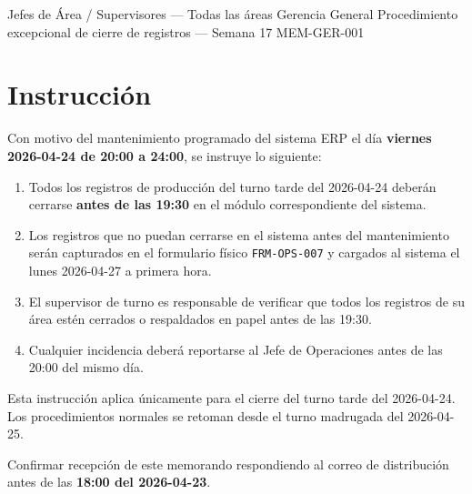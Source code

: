 \documentclass{../base/canon}
\begin{document}
\MemoBlock%
  {Jefes de Área / Supervisores — Todas las áreas}%
  {Gerencia General}%
  {Procedimiento excepcional de cierre de registros — Semana 17}%
  {MEM-GER-001}

\section{Instrucción}

Con motivo del mantenimiento programado del sistema ERP el día \textbf{viernes
2026-04-24 de 20:00 a 24:00}, se instruye lo siguiente:

\begin{enumerate}
  \item Todos los registros de producción del turno tarde del 2026-04-24 deberán
        cerrarse \textbf{antes de las 19:30} en el módulo correspondiente del sistema.
  \item Los registros que no puedan cerrarse en el sistema antes del mantenimiento
        serán capturados en el formulario físico \texttt{FRM-OPS-007} y cargados
        al sistema el lunes 2026-04-27 a primera hora.
  \item El supervisor de turno es responsable de verificar que todos los registros
        de su área estén cerrados o respaldados en papel antes de las 19:30.
  \item Cualquier incidencia deberá reportarse al Jefe de Operaciones antes de
        las 20:00 del mismo día.
\end{enumerate}

\begin{ObservationBox}[Vigencia]
  Esta instrucción aplica únicamente para el cierre del turno tarde del
  2026-04-24.  Los procedimientos normales se retoman desde el turno madrugada
  del 2026-04-25.
\end{ObservationBox}

 Confirmar recepción de este memorando respondiendo
al correo de distribución antes de las \textbf{18:00 del 2026-04-23}.


\ContactSignature
\end{document}
